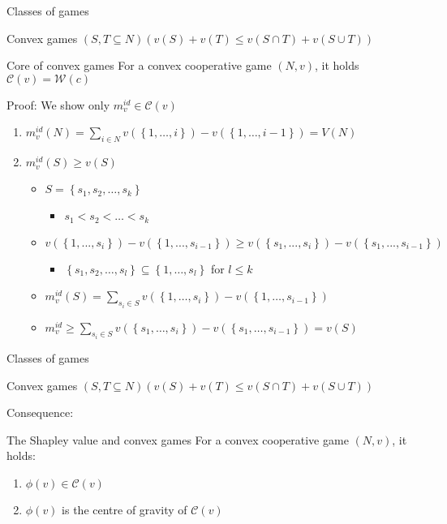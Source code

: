 \documentclass{beamer}
\begin{document}
\begin{frame}{Classes of games}
    \begin{block}{Convex games}
		$\left(S,T \subseteq N\right)\left(v(S)+v(T) \leq v\left(S \cap T\right)+v\left(S \cup T\right)\right)$
	\end{block}
	\begin{block}{Core of convex games}
		For a convex cooperative game $(N,v)$, it holds $\mathcal{C}(v)=\mathcal{W}(c)$
	\end{block}
	Proof: We show only $m^{id}_v \in \mathcal{C}(v)$
	\begin{enumerate}
		\item $m^{id}_v(N)=\sum_{i \in N} v \left(\left\{1,\dots,i\right\}\right)-v \left(\left\{1,\dots,i-1\right\}\right)=V(N)$
		\item $m^{id}_v(S) \geq v(S)$
		\begin{itemize}
			\item $S=\left\{s_1,s_2,\dots,s_k\right\}$
			\begin{itemize}
				\item $s_1<s_2<\dots<s_k$
			\end{itemize}
			\item $v (\left\{1,...,s_i\right\})-v (\left\{1,...,s_{i-1}\right\}) \geq v (\left\{s_1,...,s_i\right\})-v (\left\{s_1,...,s_{i-1}\right\})$
			\begin{itemize}
				\item $\left\{s_1,s_2,\dots,s_l\right\} \subseteq \left\{1,\dots,s_l\right\}$ for $l \leq k$
			\end{itemize}
			\item $m^{id}_v(S)=\sum_{s_i \in S} v \left(\left\{1,\dots,s_i\right\}\right) - v \left(\left\{1,\dots,s_{i-1}\right\}\right)$
			\item $m^{id}_v \geq \sum_{s_i \in S} v \left(\left\{s_1,\dots,s_i\right\}\right)-v \left(\left\{s_1,\dots,s_{i-1}\right\}\right)=v(S)$
		\end{itemize}
	\end{enumerate}
\end{frame}



\begin{frame}{Classes of games}
    \begin{block}{Convex games}
		$\left(S,T \subseteq N\right)\left(v(S)+v(T) \leq v\left(S \cap T\right)+v\left(S \cup T\right)\right)$
	\end{block}
	Consequence:
	\begin{block}{The Shapley value and  convex games}
		For a convex cooperative game $(N,v)$, it holds:
		\begin{enumerate}
			\item $\phi(v) \in \mathcal{C}(v)$
			\item $\phi(v)$ is the centre of gravity of $\mathcal{C}(v)$
		\end{enumerate}
	\end{block}
\end{frame}
\end{document}

